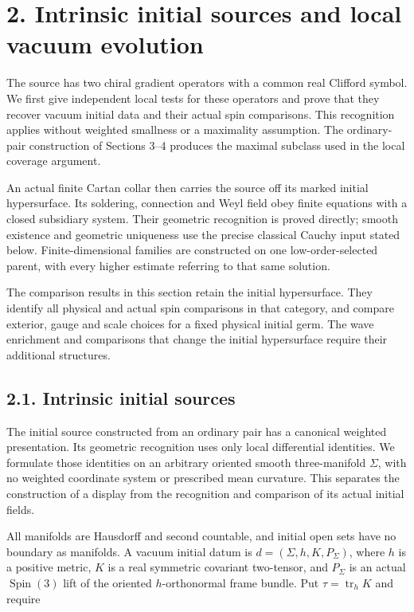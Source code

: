 \documentclass[
  english,
  11pt,
  reqno]{amsart}
\begin{document}
\section{2. Intrinsic initial sources and local vacuum
evolution}\label{intrinsic-initial-sources-and-local-vacuum-evolution}\label{sec:online-intrinsic-source-and-evolution}

The source has two chiral gradient operators with a common real Clifford
symbol. We first give independent local tests for these operators and
prove that they recover vacuum initial data and their actual spin
comparisons. This recognition applies without weighted smallness or a
maximality assumption. The ordinary-pair construction of Sections 3--4
produces the maximal subclass used in the local coverage argument.

An actual finite Cartan collar then carries the source off its marked
initial hypersurface. Its soldering, connection and Weyl field obey
finite equations with a closed subsidiary system. Their geometric
recognition is proved directly; smooth existence and geometric
uniqueness use the precise classical Cauchy input stated below.
Finite-dimensional families are constructed on one low-order-selected
parent, with every higher estimate referring to that same solution.

The comparison results in this section retain the initial hypersurface.
They identify all physical and actual spin comparisons in that category,
and compare exterior, gauge and scale choices for a fixed physical
initial germ. The wave enrichment and comparisons that change the
initial hypersurface require their additional structures.

\subsection{2.1. Intrinsic initial
sources}\label{intrinsic-initial-sources}\label{sec:online-intrinsic-initial-source}

The initial source constructed from an ordinary pair has a canonical
weighted presentation. Its geometric recognition uses only local
differential identities. We formulate those identities on an arbitrary
oriented smooth three-manifold \(\Sigma\), with no weighted coordinate
system or prescribed mean curvature. This separates the construction of
a display from the recognition and comparison of its actual initial
fields.

All manifolds are Hausdorff and second countable, and initial open sets
have no boundary as manifolds. A vacuum initial datum is
\(d=(\Sigma,h,K,P_\Sigma)\), where \(h\) is a positive metric, \(K\) is
a real symmetric covariant two-tensor, and \(P_\Sigma\) is an actual
\(\operatorname{Spin}(3)\) lift of the oriented \(h\)-orthonormal frame
bundle. Put \(\tau=\operatorname{tr}_hK\) and require
\end{document}
